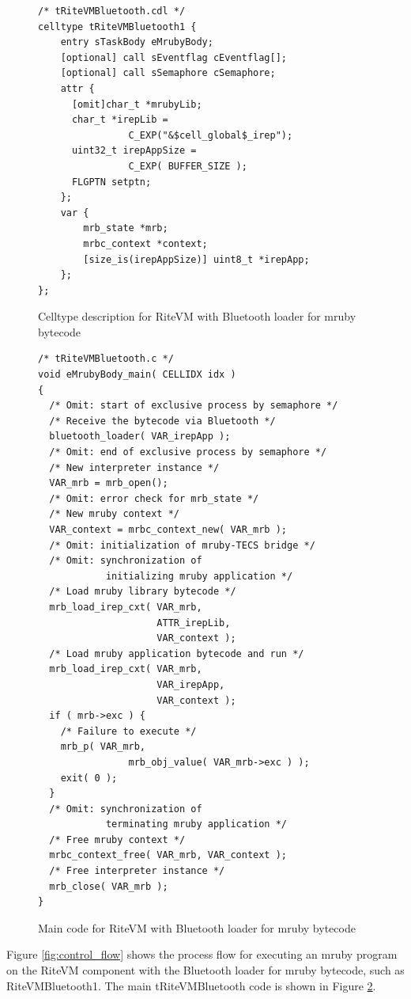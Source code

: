 \documentclass[S,R,E]{article/compsoft}
\begin{document}
\begin{figure}[t]
\centering
\begin{lstlisting}
/* tRiteVMBluetooth.cdl */
celltype tRiteVMBluetooth1 {
    entry sTaskBody eMrubyBody;
    [optional] call sEventflag cEventflag[];
    [optional] call sSemaphore cSemaphore;
    attr {
      [omit]char_t *mrubyLib;
      char_t *irepLib = 
                C_EXP("&$cell_global$_irep");
      uint32_t irepAppSize = 
                C_EXP( BUFFER_SIZE );
      FLGPTN setptn;
    };
    var {
        mrb_state *mrb;
        mrbc_context *context;
        [size_is(irepAppSize)] uint8_t *irepApp;
    };
};
\end{lstlisting}
\caption{Celltype description for RiteVM with Bluetooth loader for mruby bytecode}
\label{celltype_mrubybluetooth}
\end{figure}

\begin{figure}[t]
\centering
\begin{lstlisting}
/* tRiteVMBluetooth.c */
void eMrubyBody_main( CELLIDX idx )
{
  /* Omit: start of exclusive process by semaphore */
  /* Receive the bytecode via Bluetooth */
  bluetooth_loader( VAR_irepApp );
  /* Omit: end of exclusive process by semaphore */
  /* New interpreter instance */
  VAR_mrb = mrb_open();
  /* Omit: error check for mrb_state */
  /* New mruby context */
  VAR_context = mrbc_context_new( VAR_mrb );
  /* Omit: initialization of mruby-TECS bridge */
  /* Omit: synchronization of
            initializing mruby application */
  /* Load mruby library bytecode */
  mrb_load_irep_cxt( VAR_mrb,
                     ATTR_irepLib,
                     VAR_context );
  /* Load mruby application bytecode and run */
  mrb_load_irep_cxt( VAR_mrb,
                     VAR_irepApp,
                     VAR_context );
  if ( mrb->exc ) {
    /* Failure to execute */
    mrb_p( VAR_mrb, 
                mrb_obj_value( VAR_mrb->exc ) );
    exit( 0 );
  }
  /* Omit: synchronization of
            terminating mruby application */
  /* Free mruby context */
  mrbc_context_free( VAR_mrb, VAR_context );
  /* Free interpreter instance */
  mrb_close( VAR_mrb );
}

\end{lstlisting}
\caption{Main code for RiteVM with Bluetooth loader for mruby bytecode}
\label{maincode_mrubybluetooth}
\end{figure}

Figure \ref{fig:control_flow} shows the process flow for executing an mruby program on the RiteVM component with the Bluetooth loader for mruby bytecode, such as RiteVMBluetooth1.
The main tRiteVMBluetooth code is shown in Figure \ref{maincode_mrubybluetooth}.
\end{document}
